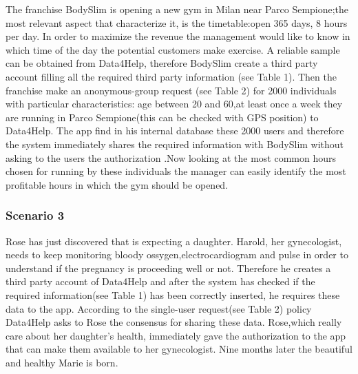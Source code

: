     The franchise BodySlim is opening a new gym in Milan near Parco Sempione;the most relevant aspect that characterize it, is the timetable:open 365 days, 8 hours per day. In order to maximize the revenue the management would like to know in which time of the day the potential customers make exercise. A reliable sample can be obtained from Data4Help, therefore BodySlim create a third party account filling all the required third party information (see Table 1). Then the franchise make an anonymous-group request (see Table 2) for 2000 individuals with particular characteristics: age between 20 and 60,at least once a week they are running in Parco Sempione(this can be checked with GPS position) to Data4Help. The app find in his internal database these 2000 users and therefore the system immediately shares the required information with BodySlim without asking to the users the authorization .Now looking at the most common hours chosen for running by these individuals the manager can easily identify the most profitable hours in which the gym should be opened.

    \subsubsection{Scenario 3}

    Rose has just discovered that is expecting a daughter. Harold, her gynecologist, needs to keep monitoring bloody ossygen,electrocardiogram and pulse in order to understand if the pregnancy is proceeding well or not. Therefore he creates a third party account of Data4Help and after the system has checked if the required information(see Table 1) has been correctly inserted, he requires these data to the app. According to the single-user request(see Table 2)  policy Data4Help asks to Rose the consensus for sharing these data. Rose,which really care about her daughter's health, immediately gave the authorization to the app that can make them available to her gynecologist. Nine months later the beautiful and healthy Marie is born.

